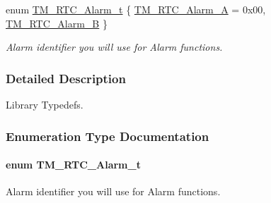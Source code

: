 \begin{DoxyCompactItemize}
enum \hyperlink{group___t_m___r_t_c___typedefs_ga3c4d1d5831bf262f1994e8cc45007e7b}{T\+M\+\_\+\+R\+T\+C\+\_\+\+Alarm\+\_\+t} \{ \hyperlink{group___t_m___r_t_c___typedefs_gga3c4d1d5831bf262f1994e8cc45007e7ba598f0843c22db1e229493414ddf14e8d}{T\+M\+\_\+\+R\+T\+C\+\_\+\+Alarm\+\_\+\+A} = 0x00, 
\hyperlink{group___t_m___r_t_c___typedefs_gga3c4d1d5831bf262f1994e8cc45007e7ba9d774b8679fbb5936a0e32aeb8e49e0c}{T\+M\+\_\+\+R\+T\+C\+\_\+\+Alarm\+\_\+\+B}
 \}
\begin{DoxyCompactList}\small\item\em Alarm identifier you will use for Alarm functions. \end{DoxyCompactList}\end{DoxyCompactItemize}


\subsubsection{Detailed Description}
Library Typedefs. 



\subsubsection{Enumeration Type Documentation}
\hypertarget{group___t_m___r_t_c___typedefs_ga3c4d1d5831bf262f1994e8cc45007e7b}{}
\paragraph[{T\+M\+\_\+\+R\+T\+C\+\_\+\+Alarm\+\_\+t}]{\setlength{\rightskip}{0pt plus 5cm}enum {\bf T\+M\+\_\+\+R\+T\+C\+\_\+\+Alarm\+\_\+t}}\label{group___t_m___r_t_c___typedefs_ga3c4d1d5831bf262f1994e8cc45007e7b}


Alarm identifier you will use for Alarm functions. 

